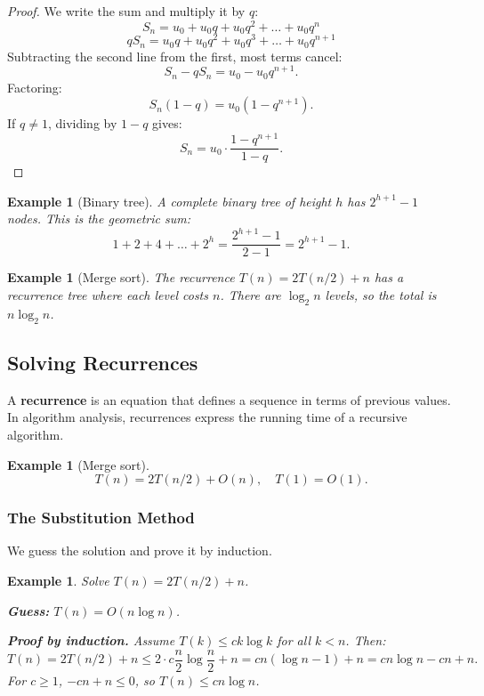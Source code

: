 \documentclass[11pt,a4paper]{article}
\newtheorem{example}[theorem]{Example}
\begin{document}
\begin{proof}
We write the sum and multiply it by $q$:
\[
S_n = u_0 + u_0 q + u_0 q^2 + \dots + u_0 q^n
\]
\[
q S_n = u_0 q + u_0 q^2 + u_0 q^3 + \dots + u_0 q^{n+1}
\]
Subtracting the second line from the first, most terms cancel:
\[
S_n - q S_n = u_0 - u_0 q^{n+1}.
\]
Factoring:
\[
S_n (1 - q) = u_0 (1 - q^{n+1}).
\]
If $q \neq 1$, dividing by $1 - q$ gives:
\[
S_n = u_0 \cdot \frac{1 - q^{n+1}}{1 - q}.
\]
\end{proof}

\begin{example}[Binary tree]
A complete binary tree of height $h$ has $2^{h+1} - 1$ nodes. This is the geometric sum:
\[
1 + 2 + 4 + \dots + 2^h = \frac{2^{h+1} - 1}{2 - 1} = 2^{h+1} - 1.
\]
\end{example}

\begin{example}[Merge sort]
The recurrence $T(n) = 2T(n/2) + n$ has a recurrence tree where each level costs $n$. There are $\log_2 n$ levels, so the total is $n \log_2 n$.
\end{example}

\subsection{Solving Recurrences}

A \textbf{recurrence} is an equation that defines a sequence in terms of previous values. In algorithm analysis, recurrences express the running time of a recursive algorithm.

\begin{example}[Merge sort]
\[
T(n) = 2T(n/2) + O(n), \quad T(1) = O(1).
\]
\end{example}

\subsubsection{The Substitution Method}

We guess the solution and prove it by induction.

\begin{example}
Solve $T(n) = 2T(n/2) + n$.

\textbf{Guess:} $T(n) = O(n \log n)$.

\textbf{Proof by induction.} Assume $T(k) \leq c k \log k$ for all $k < n$. Then:
\[
T(n) = 2T(n/2) + n \leq 2 \cdot c \frac{n}{2} \log \frac{n}{2} + n = c n (\log n - 1) + n = c n \log n - c n + n.
\]
For $c \geq 1$, $-cn + n \leq 0$, so $T(n) \leq c n \log n$.
\end{example}
\end{document}
